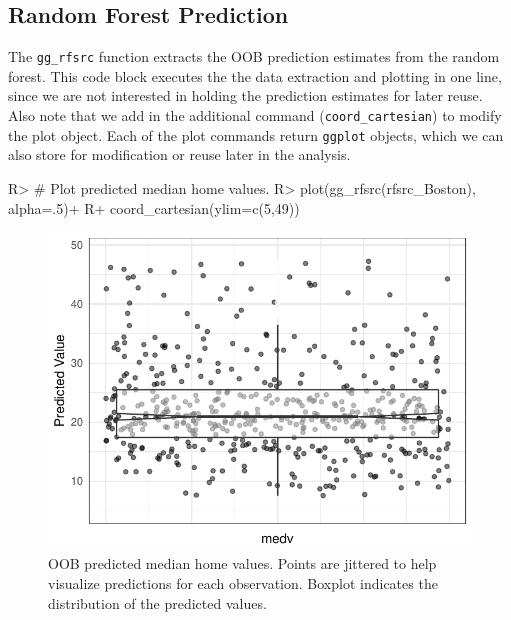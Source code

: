 \documentclass[article]{jss}
\begin{document}
\subsection{Random Forest Prediction}\label{random-forest-prediction}

The \texttt{gg\_rfsrc} function extracts the OOB prediction estimates
from the random forest. This code block executes the the data extraction
and plotting in one line, since we are not interested in holding the
prediction estimates for later reuse. Also note that we add in the
additional  command (\texttt{coord\_cartesian}) to modify
the plot object. Each of the  plot commands return
\texttt{ggplot} objects, which we can also store for modification or
reuse later in the analysis.

\begin{CodeChunk}

\begin{CodeInput}
R> # Plot predicted median home values.
R> plot(gg_rfsrc(rfsrc_Boston), alpha=.5)+
R+   coord_cartesian(ylim=c(5,49))
\end{CodeInput}
\begin{figure}

{\centering \includegraphics{Regression-rfsrc_files/figure-latex/rfsrc-1} 

}

\caption[OOB predicted median home values]{OOB predicted median home values. Points are jittered to help visualize predictions for each observation. Boxplot indicates the distribution of the predicted values.}\label{fig:rfsrc}
\end{figure}
\end{CodeChunk}
\end{document}
